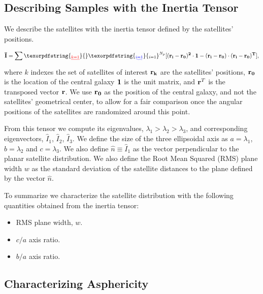 \documentclass[a4paper,fleqn,usenatbib]{mnras}
\providecommand{\DIFaddtex}[1]{{\protect\color{blue}\uwave{#1}}} %
\providecommand{\DIFdeltex}[1]{{\protect\color{red}\sout{#1}}}                      %
\providecommand{\DIFaddbegin}{} %
\providecommand{\DIFaddend}{} %
\providecommand{\DIFdelbegin}{} %
\providecommand{\DIFdelend}{} %
\providecommand{\DIFadd}[1]{\texorpdfstring{\DIFaddtex{#1}}{#1}} %
\providecommand{\DIFdel}[1]{\texorpdfstring{\DIFdeltex{#1}}{}} %
\newcommand{\DIFscaledelfig}{0.5}
\newlength{\DIFdelgraphicswidth} %
\newlength{\DIFdelgraphicsheight} %
\newcommand{\DIFaddincludegraphics}[2][]{{\color{blue}\fbox{\DIFOincludegraphics[#1]{#2}}}} %
\newcommand{\DIFdelincludegraphics}[2][]{%
\sbox{\DIFdelgraphicsbox}{\DIFOincludegraphics[#1]{#2}}%
\settoboxwidth{\DIFdelgraphicswidth}{\DIFdelgraphicsbox} %
\settoboxtotalheight{\DIFdelgraphicsheight}{\DIFdelgraphicsbox} %
\scalebox{\DIFscaledelfig}{%
\parbox[b]{\DIFdelgraphicswidth}{\usebox{\DIFdelgraphicsbox}\\[-\baselineskip] \rule{\DIFdelgraphicswidth}{0em}}\llap{\resizebox{\DIFdelgraphicswidth}{\DIFdelgraphicsheight}{%
\setlength{\unitlength}{\DIFdelgraphicswidth}%
\begin{picture}(1,1)%
\thicklines\linethickness{2pt} %
{\color[rgb]{1,0,0}\put(0,0){\framebox(1,1){}}}%
{\color[rgb]{1,0,0}\put(0,0){\line( 1,1){1}}}%
{\color[rgb]{1,0,0}\put(0,1){\line(1,-1){1}}}%
\end{picture}%
}\hspace*{3pt}}} %
} %
\DeclareRobustCommand{\DIFaddbegin}{\DIFOaddbegin \let\includegraphics\DIFaddincludegraphics} %
\DeclareRobustCommand{\DIFaddend}{\DIFOaddend \let\includegraphics\DIFOincludegraphics} %
\DeclareRobustCommand{\DIFdelbegin}{\DIFOdelbegin \let\includegraphics\DIFdelincludegraphics} %
\DeclareRobustCommand{\DIFdelend}{\DIFOaddend \let\includegraphics\DIFOincludegraphics} %
\begin{document}
\subsection{Describing Samples with the Inertia Tensor}

We describe the satellites with the inertia
tensor defined by the satellites' positions.  

\begin{equation}
{\bf{\bar{I}}} = \sum\DIFdelbegin \DIFdel{_{k=1}}\DIFdelend \DIFaddbegin \DIFadd{_{i=1}}\DIFaddend ^{N_p}[(\bf{r}_i - \bf{r}_0)^2\cdot \bf{1} -
  (\bf{r}_i-\bf{r}_0)\cdot (\bf{r}_i - \bf{r}_0)^{T}],
\label{eq:intensor}
\end{equation}
%
where $k$ indexes the set of satellites of interest
$\bf{r}_k$ are the satellites' positions, $\bf{r}_{0}$ is the location
of the central galaxy $\bf{1}$ is the unit matrix, and  
${\bf r}^T$ is the transposed vector $\bf{r}$. 
We use $\bf{r}_0$ as the position of the central galaxy, and not the
satellites' geometrical center, to allow for a fair comparison once
the angular positions of the satellites are randomized around this
point. 

From this tensor we compute its eigenvalues,
$\lambda_1>\lambda_2>\lambda_3$, and corresponding eigenvectors,
$\hat{I}_1$, $\hat{I}_2$, $\hat{I}_3$.
We define the size of the three ellipsoidal axis as
$a=\lambda_1$, $b=\lambda_2$ and $c=\lambda_3$.
We also define $\hat{n}\equiv \hat{I}_1$ as the vector perpendicular to the
planar satellite distribution. 
We also define the Root Mean Squared (RMS) plane width $w$ as the
standard deviation of the satellite distances to the plane defined by
the vector $\hat{n}$.    

To summarize we characterize the satellite distribution with the following
quantities obtained from the inertia tensor: 
\begin{itemize}
\item RMS plane width, $w$.
\item $c/a$ axis ratio.
\item $b/a$ axis ratio.
\end{itemize}



\subsection{Characterizing Asphericity}
\end{document}
